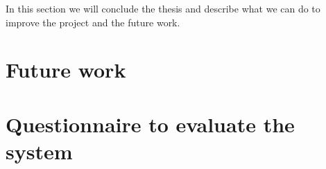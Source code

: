 In this section we will conclude the thesis and describe what we can do to improve the project and the future work.

\section{Future work}

\section{Questionnaire to evaluate the system}
